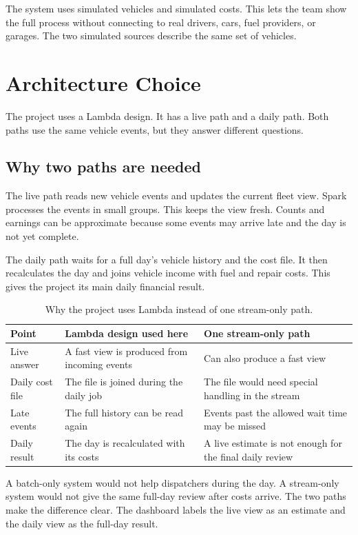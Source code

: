 \documentclass[11pt,a4paper]{article}
\begin{document}
The system uses simulated vehicles and simulated costs. This lets the team show the full process
without connecting to real drivers, cars, fuel providers, or garages. The two simulated sources
describe the same set of vehicles.

\section{Architecture Choice}

The project uses a Lambda design. It has a live path and a daily path. Both paths use the same
vehicle events, but they answer different questions.

\subsection{Why two paths are needed}

The live path reads new vehicle events and updates the current fleet view. Spark processes the
events in small groups. This keeps the view fresh. Counts and earnings can be approximate because
some events may arrive late and the day is not yet complete.

The daily path waits for a full day's vehicle history and the cost file. It then recalculates the
day and joins vehicle income with fuel and repair costs. This gives the project its main daily
financial result.

\begin{table}[htbp]\centering\small
\caption{Why the project uses Lambda instead of one stream-only path.}
\begin{tabularx}{\textwidth}{@{}p{3.0cm}XX@{}}
\toprule
\textbf{Point} & \textbf{Lambda design used here} & \textbf{One stream-only path}\\
\midrule
Live answer & A fast view is produced from incoming events & Can also produce a fast view\\
Daily cost file & The file is joined during the daily job & The file would need special handling in the stream\\
Late events & The full history can be read again & Events past the allowed wait time may be missed\\
Daily result & The day is recalculated with its costs & A live estimate is not enough for the final daily review\\
\bottomrule
\end{tabularx}
\end{table}

A batch-only system would not help dispatchers during the day. A stream-only system would not give
the same full-day review after costs arrive. The two paths make the difference clear. The dashboard
labels the live view as an estimate and the daily view as the full-day result.
\end{document}
